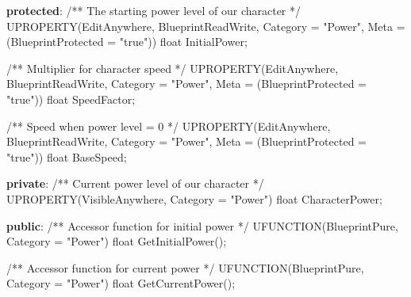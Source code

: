 \documentclass[
  letterpaper,
  DIV=11,
  numbers=noendperiod]{scrartcl}
\newenvironment{Shaded}{\begin{snugshade}}{\end{snugshade}}
\newcommand{\CommentTok}[1]{\textcolor[rgb]{0.37,0.37,0.37}{#1}}
\newcommand{\DataTypeTok}[1]{\textcolor[rgb]{0.68,0.00,0.00}{#1}}
\newcommand{\KeywordTok}[1]{\textcolor[rgb]{0.00,0.23,0.31}{\textbf{#1}}}
\newcommand{\NormalTok}[1]{\textcolor[rgb]{0.00,0.23,0.31}{#1}}
\newcommand{\OperatorTok}[1]{\textcolor[rgb]{0.37,0.37,0.37}{#1}}
\newcommand{\StringTok}[1]{\textcolor[rgb]{0.13,0.47,0.30}{#1}}
\begin{document}
\begin{Shaded}
\begin{Highlighting}[]
\KeywordTok{protected}\OperatorTok{:}
    \CommentTok{/** The starting power level of our character */}
\NormalTok{    UPROPERTY}\OperatorTok{(}\NormalTok{EditAnywhere}\OperatorTok{,}\NormalTok{ BlueprintReadWrite}\OperatorTok{,}\NormalTok{ Category }\OperatorTok{=} \StringTok{"Power"}\OperatorTok{,}\NormalTok{ Meta }\OperatorTok{=} \OperatorTok{(}\NormalTok{BlueprintProtected }\OperatorTok{=} \StringTok{"true"}\OperatorTok{))}
    \DataTypeTok{float}\NormalTok{ InitialPower}\OperatorTok{;}
    
    \CommentTok{/** Multiplier for character speed */}
\NormalTok{    UPROPERTY}\OperatorTok{(}\NormalTok{EditAnywhere}\OperatorTok{,}\NormalTok{ BlueprintReadWrite}\OperatorTok{,}\NormalTok{ Category }\OperatorTok{=} \StringTok{"Power"}\OperatorTok{,}\NormalTok{ Meta }\OperatorTok{=} \OperatorTok{(}\NormalTok{BlueprintProtected }\OperatorTok{=} \StringTok{"true"}\OperatorTok{))}
    \DataTypeTok{float}\NormalTok{ SpeedFactor}\OperatorTok{;}
    
    \CommentTok{/** Speed when power level = 0 */}
\NormalTok{    UPROPERTY}\OperatorTok{(}\NormalTok{EditAnywhere}\OperatorTok{,}\NormalTok{ BlueprintReadWrite}\OperatorTok{,}\NormalTok{ Category }\OperatorTok{=} \StringTok{"Power"}\OperatorTok{,}\NormalTok{ Meta }\OperatorTok{=} \OperatorTok{(}\NormalTok{BlueprintProtected }\OperatorTok{=} \StringTok{"true"}\OperatorTok{))}
    \DataTypeTok{float}\NormalTok{ BaseSpeed}\OperatorTok{;}

\KeywordTok{private}\OperatorTok{:}
    \CommentTok{/** Current power level of our character */}
\NormalTok{    UPROPERTY}\OperatorTok{(}\NormalTok{VisibleAnywhere}\OperatorTok{,}\NormalTok{ Category }\OperatorTok{=} \StringTok{"Power"}\OperatorTok{)}
    \DataTypeTok{float}\NormalTok{ CharacterPower}\OperatorTok{;}

\KeywordTok{public}\OperatorTok{:}
    \CommentTok{/** Accessor function for initial power */}
\NormalTok{    UFUNCTION}\OperatorTok{(}\NormalTok{BlueprintPure}\OperatorTok{,}\NormalTok{ Category }\OperatorTok{=} \StringTok{"Power"}\OperatorTok{)}
    \DataTypeTok{float}\NormalTok{ GetInitialPower}\OperatorTok{();}
    
    \CommentTok{/** Accessor function for current power */}
\NormalTok{    UFUNCTION}\OperatorTok{(}\NormalTok{BlueprintPure}\OperatorTok{,}\NormalTok{ Category }\OperatorTok{=} \StringTok{"Power"}\OperatorTok{)}
    \DataTypeTok{float}\NormalTok{ GetCurrentPower}\OperatorTok{();}
    

\end{Highlighting}
\end{Shaded}
\end{document}
